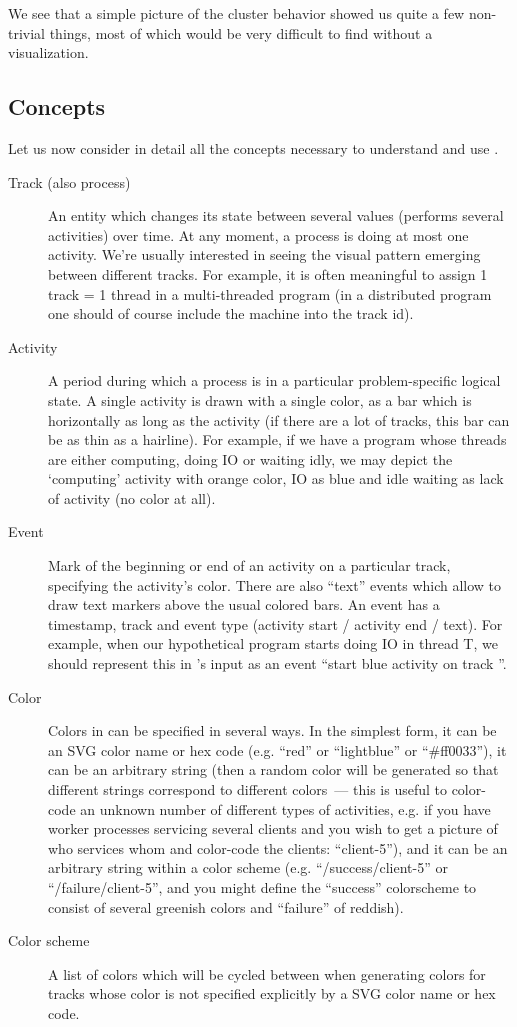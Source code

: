 \documentclass{article}
\begin{document}
\vspace{3mm}

We see that a simple picture of the cluster behavior showed us quite a few non-trivial things, most of which would be very difficult to find without a visualization.

\pagebreak
\subsection{Concepts}

Let us now consider in detail all the concepts necessary to understand and use \splot{}.

\begin{description}
\item[Track (also process)] An entity which changes its state between several values (performs several activities) over time. At any moment, a process is doing at most one activity. We're usually interested in seeing the visual pattern emerging between different tracks. For example, it is often meaningful to assign 1 track = 1 thread in a multi-threaded program (in a distributed program one should of course include the machine into the track id).
\item[Activity] A period during which a process is in a particular problem-specific logical state. A single activity is drawn with a single color, as a bar which is horizontally as long as the activity (if there are a lot of tracks, this bar can be as thin as a hairline). For example, if we have a program whose threads are either computing, doing IO or waiting idly, we may depict the `computing' activity with orange color, IO as blue and idle waiting as lack of activity (no color at all).
\item[Event] Mark of the beginning or end of an activity on a particular track, specifying the activity's color. There are also ``text'' events which allow to draw text markers above the usual colored bars. An event has a timestamp, track and event type (activity start / activity end / text). For example, when our hypothetical program starts doing IO in thread T, we should represent this in \splot{}'s input as an event ``start blue activity on track ''.
\item[Color] Colors in \splot{} can be specified in several ways. In the simplest form, it can be an SVG color name or hex code (e.g. ``red'' or ``lightblue'' or ``\#ff0033''), it can be an arbitrary string (then a random color will be generated so that different strings correspond to different colors~--- this is useful to color-code an unknown number of different types of activities, e.g. if you have worker processes servicing several clients and you wish to get a picture of who services whom and color-code the clients: ``client-5''), and it can be an arbitrary string within a color scheme (e.g. ``/success/client-5'' or ``/failure/client-5'', and you might define the ``success'' colorscheme to consist of several greenish colors and ``failure'' of reddish).
\item[Color scheme] A list of colors which will be cycled between when generating colors for tracks whose color is not specified explicitly by a SVG color name or hex code.
\end{description}
\end{document}
